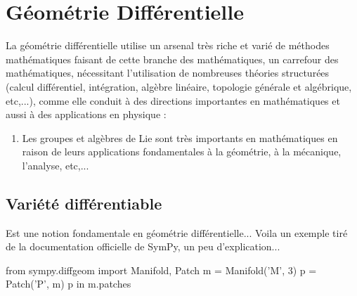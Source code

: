 \chapter{Géométrie Différentielle}
La géométrie différentielle utilise un arsenal très riche et varié de méthodes mathématiques faisant de cette branche des mathématiques, un carrefour des mathématiques, nécessitant l’utilisation de nombreuses théories
structurées (calcul différentiel, intégration, algèbre linéaire, topologie générale et algébrique, etc,...), comme elle conduit à des directions importantes en mathématiques et aussi à des applications en physique :
 \begin{enumerate}
   \item Les groupes et algèbres de Lie sont très importants en mathématiques en raison de leurs applications fondamentales à la géométrie, à la mécanique, l’analyse, etc,... 
  \end{enumerate}
  \section{Variété différentiable}
  Est une notion fondamentale en géométrie différentielle...
  Voila un exemple tiré de la documentation officielle de SymPy, un peu d'explication...
  \begin{python}
  from sympy.diffgeom import Manifold, Patch
  m = Manifold('M', 3)
  p = Patch('P', m)
  p in m.patches
  \end{python}

